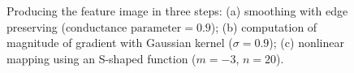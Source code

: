 \begin{figure}[t]
\centering
\hfil
\hfil
\caption{Producing the feature image in three steps: (a) smoothing with edge preserving ($\text{conductance parameter} = 0.9$); (b) computation of magnitude of gradient with Gaussian kernel ($\sigma = 0.9$); (c) nonlinear mapping using an S-shaped function ($m = -3$, $n = 20$).}
\label{fig:PotentialImageGeneration}
\end{figure}
